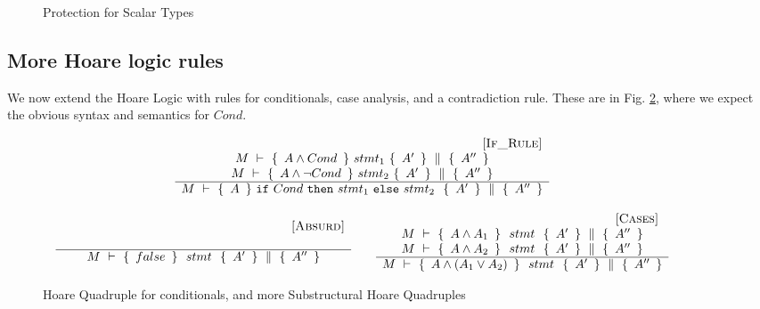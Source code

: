 \begin{figure}[htb]
\caption{Protection for Scalar Types}
\label{f:protection:conseq:ext}
\end{figure}

\subsection{More Hoare logic rules}
\label{s:app:more:Hoare}

We now  extend the Hoare Logic with rules for conditionals, case analysis, and a contradiction rule.
These are in Fig. \ref{f:if}, {where we expect the obvious syntax and semantics for $Cond$}.

\begin{figure}[htb]
$
\begin{array}{c}
\begin{array}{c} \strut \ \ \ \ \ \ \ \ \ \ \ \ \ \ \ \ \ \ \ \ \ \ \ \ \ \ \ \ \ \ \ \ \ \ \ \ \ \ \ \ \ \ \ \ \ \ \ \ \ \ {{\mbox{\hspace{2.5cm} [\sc{If\_Rule}]}}} \\ 
	 \begin{array}{c}
	  M\ \vdash\ \{\,\  A \wedge Cond \  \, \} \    stmt_1   \  \{\,\ A' \ \, \}\, \,\parallel\,\, \{\, \ A'' \  \, \}
	\\
	    M\ \vdash\ \{\,\  A \wedge \neg Cond \  \, \} \    stmt_2   \  \{\,\ A' \ \, \}\, \,\parallel\,\, \{\, \ A'' \  \, \}	
	\end{array}
	 \\ \hline   	
	M\ \vdash\ \{\,\  A \  \, \} \  \mbox{\normalfont{\texttt{if}}}\ Cond\ \mbox{\normalfont{\texttt{then}}}\ stmt_1\ \mbox{\normalfont{\texttt{else}}}\ stmt_2 \ \  \{\,\ A' \ \, \}\, \,\parallel\,\, \{\, \ A'' \  \, \}
 \end{array}
\\
\\
\begin{array}{lcl}
{
 \begin{array}{c} \strut \ \ \ \ \ \ \ \ \ \ \ \ \ \ \ \ \ \ \ \ \ \ \ \ \ \ \ \ \ \ \ \ \ \ \ \ \ \ \ \ \ \ \ \ \ \ \ \ \ \ {{\mbox{\hspace{0.5cm} [\sc{Absurd}]}}} \\ 	
	 \\ \hline   	
	M\ \vdash\ \{\,\  false \  \, \} \  \ stmt \ \  \{\,\ A' \ \, \}\, \,\parallel\,\, \{\, \ A'' \  \, \} 
 \end{array} 
} & &
{
\begin{array}{c} \strut \ \ \ \ \ \ \ \ \ \ \ \ \ \ \ \ \ \ \ \ \ \ \ \ \ \ \ \ \ \ \ \ \ \ \ \ \ \ \ \ \ \ \ \ \ \ \ \ \ \ {{\mbox{\hspace{0.5cm} [\sc{Cases}]}}} \\  \begin{array}{l}
	M\ \vdash\ \{\,\  A \wedge A_{1}  \  \, \} \  \ stmt \ \  \{\,\ A' \ \, \}\, \,\parallel\,\, \{\, \ A'' \  \, \}
		\\
		M\ \vdash\ \{\,\   A \wedge A_{2} \  \, \} \  \ stmt \ \  \{\,\ A' \ \, \}\, \,\parallel\,\, \{\, \ A'' \  \, \}
	\end{array}	
	 \\ \hline   	
	M\ \vdash\ \{\,\  A \wedge (A_1 \vee A_2) \  \, \} \  \ stmt \ \  \{\,\ A' \ \, \}\, \,\parallel\,\, \{\, \ A'' \  \, \}
 \end{array}
}
\end{array}
\end{array}
$
\caption{Hoare Quadruple  for conditionals, and more Substructural Hoare Quadruples}
\label{f:if}
\end{figure}


